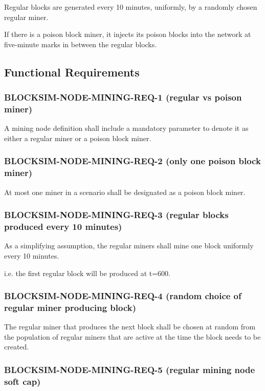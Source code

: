 \documentclass{scrreprt}
\begin{document}
Regular blocks are generated every 10 minutes, uniformly, by a randomly chosen
regular miner.

If there is a poison block miner, it injects its poison blocks into the network
at five-minute marks in between the regular blocks.


\subsection{Functional Requirements}


\subsubsection{BLOCKSIM-NODE-MINING-REQ-1 (regular vs poison miner)}

A mining node definition shall include a mandatory parameter to denote
it as either a regular miner or a poison block miner.

\subsubsection{BLOCKSIM-NODE-MINING-REQ-2 (only one poison block miner)}

At most one miner in a scenario shall be designated as a poison block
miner.

\subsubsection{BLOCKSIM-NODE-MINING-REQ-3 (regular blocks produced every 10 minutes)}

As a simplifying assumption, the regular miners shall mine one block uniformly
every 10 minutes.

i.e. the first regular block will be produced at t=600.

\subsubsection{BLOCKSIM-NODE-MINING-REQ-4 (random choice of regular miner producing block)}

The regular miner that produces the next block shall be chosen at random
from the population of regular miners that are active at the time the block
needs to be created.


\subsubsection{BLOCKSIM-NODE-MINING-REQ-5 (regular mining node soft cap)}
\end{document}
